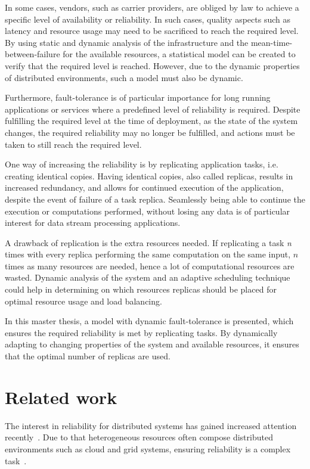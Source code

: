 \documentclass{cslthse-msc}
\begin{document}
In some cases, vendors, such as carrier providers, are obliged by law to achieve a specific level of availability or reliability. In such cases, quality aspects such as latency and resource usage may need to be sacrificed to reach the required level. By using static and dynamic analysis of the infrastructure and the mean-time-between-failure for the available resources, a statistical model can be created to verify that the required level is reached. However, due to the dynamic properties of distributed environments, such a model must also be dynamic. 

Furthermore, fault-tolerance is of particular importance for long running applications or services where a predefined level of reliability is required. Despite fulfilling the required level at the time of deployment, as the state of the system changes, the required reliability may no longer be fulfilled, and actions must be taken to still reach the required level.

One way of increasing the reliability is by replicating application tasks, i.e. creating identical copies. Having identical copies, also called replicas, results in increased redundancy, and allows for continued execution of the application, despite the event of failure of a task replica. Seamlessly being able to continue the execution or computations performed, without losing any data is of particular interest for data stream processing applications.

A drawback of replication is the extra resources needed. If replicating a task \emph{n} times with every replica performing the same computation on the same input, $n$ times as many resources are needed, hence a lot of computational resources are wasted. Dynamic analysis of the system and an adaptive scheduling technique could help in determining on which resources replicas should be placed for optimal resource usage and load balancing.

In this master thesis, a model with dynamic fault-tolerance is presented, which ensures the required reliability is met by replicating tasks. By dynamically adapting to changing properties of the system and available resources, it ensures that the optimal number of replicas are used.

\section{Related work} \label{sec:introduction_related_work}
The interest in reliability for distributed systems has gained increased attention recently~\cite{replicationManagement}. Due to that heterogeneous resources often compose distributed environments such as cloud and grid systems, ensuring reliability is a complex task~\cite{cloudServiceRel, surveyReliabilityDistr}.
\end{document}
